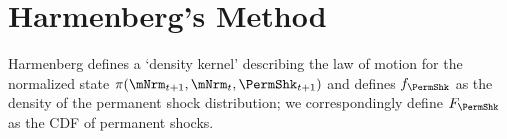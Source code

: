 \documentclass[\econtexRoot/BufferStockTheory]{subfiles}
\begin{document}
\begin{comment}
Consider any configuration of parameter values under which, with the variance of permanent shocks equal to zero, the {\GICRaw} holds exactly:
\begin{align}
  \GICRaw & = 1 = \exp\left(\tilde{\Ex}[\log \PermShk]\right)
\end{align}
\end{comment}

\section{Harmenberg's Method}\label{sec:ApndxHarKmenberg}

\newcommand{\PermLvlPrb}{p}
\newcommand{\PermLvlVec}{\mathrm{p}}
\newcommand{\lomdkPrb}{\pi} 
\newcommand{\lomdkPrbmm}{\varpi} 
\newcommand{\lomdkMat}{\Pi}
\newcommand{\Prb}{f}
\newcommand{\Vct}{\digamma}
\newcommand{\PermShkPrb}{\Prb_{\PermShk}}
\newcommand{\PermShkVec}{\Vct_{\PermShk}}
\newcommand{\PermShkRawPrb}{\Prb_{\PermShk}}
\newcommand{\PermShkRawVec}{\Vct_{\PermShk}}
\newcommand{\PermShkWgtPrb}{\tilde{\Prb}_{\PermShk}}
\newcommand{\PermShkWgtVec}{\tilde{\Vct}_{\PermShk}}
\newcommand{\mpPrb}{\chi}
\newcommand{\mpPrbMarg}{\mpPrb^{\mNrm}}
\newcommand{\Wgt}{\tilde}
\newcommand{\Raw}{}
\newcommand{\mpPrbMargRaw}{\Raw{\mpPrb}^{\mNrm}}
\newcommand{\mpPrbMargWgt}{\Wgt{\mpPrb}^{\mNrm}}
\newcommand{\mpMat}{\mathrm{X}}
\newcommand{\mpMatMarg}{\mpMat^{\mNrm}}
\newcommand{\mpMatMargRaw}{\Raw{\mpMat}^{\mNrm}}
\newcommand{\mpMatMargWgt}{\Wgt{\mpMat}^{\mNrm}}
\newcommand{\mNrmVec}{\mathrm{m}}
\newcommand{\mNrmNow}{\mNrm_{t}}
\newcommand{\mNrmNxt}{\mNrm_{t+1}}
\newcommand{\Bot}{\ushort}
\newcommand{\mNrmNxtBot}{\Bot{\mNrm}_{t+1}}
\newcommand{\PermShkNow}{\PermShk_{t}}
\newcommand{\PermShkPrbNxt}{\PermShk_{t+1}}
\newcommand{\PermShkPrbBot}{\Bot{\PermShk}}
\newcommand{\PermShkPrbNxtBot}{\Bot{\PermShk}_{t+1}}
\newcommand{\PermLvlPrbNxt}{\PermLvlPrb_{t+1}}
\newcommand{\PermLvlPrbNxtBot}{\Bot{\PermLvlPrb}_{t+1}}
\newcommand{\PermLvlPrbNow}{\PermLvlPrb_{t}}
\newcommand{\TranShkNow}{\TranShk_{t}}
\newcommand{\TranShkNxt}{\TranShk_{t+1}}
\newcommand{\mLvlNow}{\mLvl_{t}}
\newcommand{\mLvlNxt}{\mLvl_{t+1}}

Harmenberg defines a `density kernel' describing the law of motion for the normalized state $\lomdkPrb(\mNrmNxt,\mNrmNow,\PermShkPrbNxt)$ and defines $\PermShkRawPrb$ as the density of the permanent shock distribution; we correspondingly define $F_{\PermShk}$ as the CDF of permanent shocks.
\end{document}
